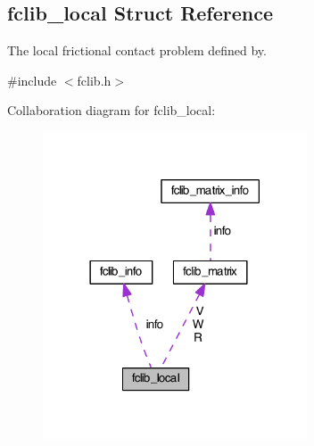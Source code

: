\hypertarget{structfclib__local}{\subsection{fclib\-\_\-local Struct Reference}
\label{structfclib__local}
}


The local frictional contact problem defined by.  




{\ttfamily \#include $<$fclib.\-h$>$}



Collaboration diagram for fclib\-\_\-local\-:\nopagebreak
\begin{figure}[H]
\begin{center}
\leavevmode
\includegraphics[width=222pt]{structfclib__local__coll__graph}
\end{center}
\end{figure}
